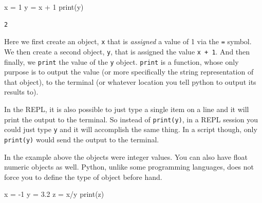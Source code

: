 \documentclass[
  letterpaper,
]{scrbook}
\newenvironment{Shaded}{\begin{snugshade}}{\end{snugshade}}
\newcommand{\BuiltInTok}[1]{\textcolor[rgb]{0.00,0.23,0.31}{#1}}
\newcommand{\DecValTok}[1]{\textcolor[rgb]{0.68,0.00,0.00}{#1}}
\newcommand{\FloatTok}[1]{\textcolor[rgb]{0.68,0.00,0.00}{#1}}
\newcommand{\NormalTok}[1]{\textcolor[rgb]{0.00,0.23,0.31}{#1}}
\newcommand{\OperatorTok}[1]{\textcolor[rgb]{0.37,0.37,0.37}{#1}}
\begin{document}
\begin{Shaded}
\begin{Highlighting}[]
\NormalTok{x }\OperatorTok{=} \DecValTok{1}
\NormalTok{y }\OperatorTok{=}\NormalTok{ x }\OperatorTok{+} \DecValTok{1}
\BuiltInTok{print}\NormalTok{(y)}
\end{Highlighting}
\end{Shaded}

\begin{verbatim}
2
\end{verbatim}

Here we first create an object, \texttt{x} that is \emph{assigned} a
value of 1 via the \texttt{=} symbol. We then create a second object,
\texttt{y}, that is assigned the value \texttt{x\ +\ 1}. And then
finally, we \texttt{print} the value of the \texttt{y} object.
\texttt{print} is a function, whose only purpose is to output the value
(or more specifically the string representation of that object), to the
terminal (or whatever location you tell python to output its results
to).

\begin{tcolorbox}[enhanced jigsaw, toprule=.15mm, rightrule=.15mm, arc=.35mm, opacityback=0, coltitle=black, bottomrule=.15mm, left=2mm, opacitybacktitle=0.6, bottomtitle=1mm, colback=white, colframe=quarto-callout-note-color-frame, colbacktitle=quarto-callout-note-color!10!white, titlerule=0mm, breakable, title={Note}, toptitle=1mm, leftrule=.75mm]

In the REPL, it is also possible to just type a single item on a line
and it will print the output to the terminal. So instead of
\texttt{print(y)}, in a REPL session you could just type \texttt{y} and
it will accomplish the same thing. In a script though, only
\texttt{print(y)} would send the output to the terminal.

\end{tcolorbox}

In the example above the objects were integer values. You can also have
float numeric objects as well. Python, unlike some programming
languages, does not force you to define the type of object before hand.

\begin{Shaded}
\begin{Highlighting}[]
\NormalTok{x }\OperatorTok{=} \OperatorTok{{-}}\DecValTok{1}
\NormalTok{y }\OperatorTok{=} \FloatTok{3.2}
\NormalTok{z }\OperatorTok{=}\NormalTok{ x}\OperatorTok{/}\NormalTok{y}
\BuiltInTok{print}\NormalTok{(z)}
\end{Highlighting}
\end{Shaded}
\end{document}
